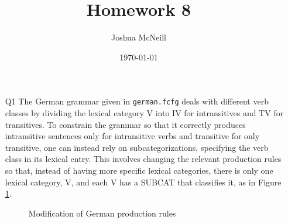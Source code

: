 \documentclass{article}
\title{Homework 8}
\author{Joshua McNeill}
\date{\today}
\begin{document}
  \maketitle
  \begin{enumerate}
    \item[Q1] The German grammar given in \texttt{german.fcfg} deals with different verb classes by dividing the lexical category V into IV for intransitives and TV for transitives.
    To constrain the grammar so that it correctly produces intransitive sentences only for intransitive verbs and transitive for only transitive, one can instead rely on subcategorizations, specifying the verb class in its lexical entry.
    This involves changing the relevant production rules so that, instead of having more specific lexical categories, there is only one lexical category, V, and each V has a SUBCAT that classifies it, as in Figure \ref{fig:germ_productions}.
    \begin{figure}[htbp]
      \caption{Modification of German production rules}
      \label{fig:germ_productions}
      
    \end{figure}
    
  \end{enumerate}
\end{document}
